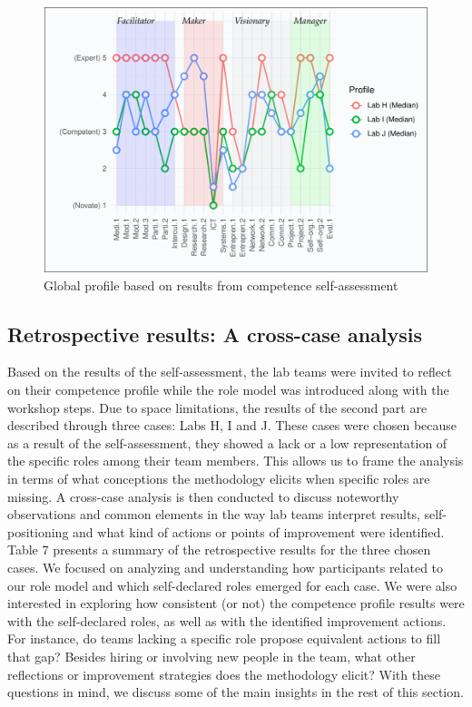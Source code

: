 \documentclass[AMA,STIX1COL,APA,STIX2COL]{WileyNJD-v2}
\begin{document}
\begin{figure}

{\centering \includegraphics[width=468px]{index_files/figure-latex/Fig3-1} 

}

\caption{Global profile based on results from competence self-assessment}\label{fig:Fig3}
\end{figure}

\hypertarget{retrospective-results-a-cross-case-analysis}{%
\subsection{Retrospective results: A cross-case
analysis}\label{retrospective-results-a-cross-case-analysis}}

Based on the results of the self-assessment, the lab teams were invited
to reflect on their competence profile while the role model was
introduced along with the workshop steps. Due to space limitations, the
results of the second part are described through three cases: Labs H, I
and J. These cases were chosen because as a result of the
self-assessment, they showed a lack or a low representation of the
specific roles among their team members. This allows us to frame the
analysis in terms of what conceptions the methodology elicits when
specific roles are missing. A cross-case analysis is then conducted to
discuss noteworthy observations and common elements in the way lab teams
interpret results, self-positioning and what kind of actions or points
of improvement were identified. Table 7 presents a summary of the
retrospective results for the three chosen cases. We focused on
analyzing and understanding how participants related to our role model
and which self-declared roles emerged for each case. We were also
interested in exploring how consistent (or not) the competence profile
results were with the self-declared roles, as well as with the
identified improvement actions. For instance, do teams lacking a
specific role propose equivalent actions to fill that gap? Besides
hiring or involving new people in the team, what other reflections or
improvement strategies does the methodology elicit? With these questions
in mind, we discuss some of the main insights in the rest of this
section.
\end{document}
